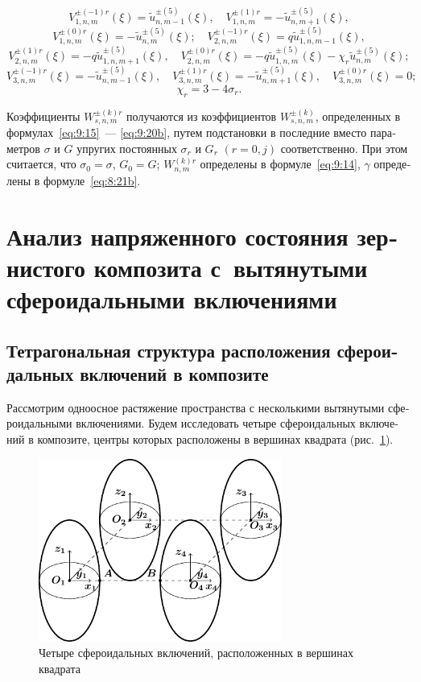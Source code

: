 \begin{russian}
$$$$
$$
V_{1,n,m}^{ \pm ( - 1)r}(\xi ) = \tilde u_{n,m - 1}^{ \pm (5)}(\xi ),\quad V_{1,n,m}^{ \pm (1)r} =  - \tilde u_{n,m + 1}^{ \pm (5)}(\xi ),
$$
$$
V_{1,n,m}^{ \pm (0)r}(\xi ) =  - \tilde u_{n,m}^{ \pm (5)}(\xi );\quad V_{2,n,m}^{ \pm ( - 1)r}(\xi ) = q\tilde u_{1,n,m - 1}^{ \pm (5)}(\xi ),
$$
$$
V_{2,n,m}^{ \pm (1)r}(\xi ) =  - q\tilde u_{1,n,m + 1}^{ \pm (5)}(\xi ),\quad V_{2,n,m}^{ \pm (0)r}(\xi ) =  - q\tilde u_{1,n,m}^{ \pm (5)}(\xi ) - {\chi _r}\tilde u_{n,m}^{ \pm (5)}(\xi );
$$
$$
V_{3,n,m}^{ \pm ( - 1)r}(\xi ) =  - \tilde u_{n,m - 1}^{ \pm (5)}(\xi ),\quad V_{3,n,m}^{ \pm (1)r}(\xi ) =  - \tilde u_{n,m + 1}^{ \pm (5)}(\xi ),\quad V_{3,n,m}^{ \pm (0)r}(\xi ) = 0;
$$
$$
{\chi _r} = 3 - 4{\sigma _r}.
$$

Коэффициенты $W_{s,n,m}^{ \pm (k)r}$ получаются из коэффициентов $W_{s,n,m}^{ \pm (k)}$, определенных в формулах~\eqref{eq:9:15}~--- \eqref{eq:9:20b}, путем подстановки в последние вместо параметров $\sigma$ и $G$ упругих постоянных $\sigma_r$ и $G_r$ $(r=0,j)$ соответственно. При этом считается, что $\sigma_0=\sigma$, $G_0=G$; $W_{n,m}^{(k)r}$ определены в формуле~\eqref{eq:9:14}, $\gamma$ определены в формуле~\eqref{eq:8:21b}.

\section[Анализ напряженного состояния зернистого композита с вытянутыми сфероидальными включениями]{Анализ напряженного состояния зернистого композита с~вытянутыми сфероидальными включениями}

\subsection{Тетрагональная структура расположения сфероидальных включений в композите}

Рассмотрим одноосное растяжение пространства с несколькими вытянутыми сфероидальными включениями. Будем исследовать четыре сфероидальных включений в композите, центры которых расположены в вершинах квадрата (рис.~\ref{f:9:66}).

\begin{figure}[h!]
\centering
\includegraphics[width=8cm]{cartesian-spheroids-4.pdf}
\caption{Четыре сфероидальных включений, расположенных в вершинах квадрата}
\label{f:9:66}
\end{figure}


\end{russian}

